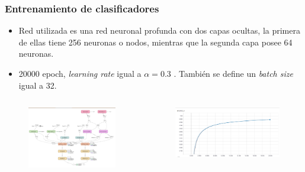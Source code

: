 \documentclass[mathserif]{beamer}
\begin{document}
\begin{frame}
\frametitle{Entrenamiento de clasificadores}

\begin{itemize}
\item Red utilizada es una red neuronal profunda con dos capas ocultas, la primera de ellas tiene 256 neuronas o nodos, mientras que la segunda capa posee 64 neuronas.

\item 20000 epoch, \textit{learning rate}  igual a $\alpha = 0.3$ . También se define un \textit{batch size} igual a 32.
\end{itemize}
\begin{columns}[t] 

\begin{figure}
\includegraphics[width=\textwidth]{../figures/nn_estructura.png}
\end{figure}



\begin{figure}
\includegraphics[width=\textwidth]{../figures/nn_plot.png}
\end{figure}

\end{columns}


\end{frame}
\end{document}
